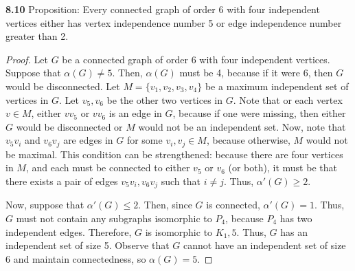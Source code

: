 \documentclass[12pt]{article}
\begin{document}
\newpage\noindent\textbf{8.10} Proposition: Every connected graph of order 6 with four independent vertices either has vertex independence number 5 or edge independence number greater than 2.
\begin{proof}
    Let $G$ be a connected graph of order 6 with four independent vertices.
    Suppose that $\alpha(G) \neq 5$.
    Then, $\alpha(G)$ must be 4, because if it were 6, then $G$ would be disconnected.
    Let $M = \{v_1, v_2, v_3, v_4\}$ be a maximum independent set of vertices in $G$.
    Let $v_5, v_6$ be the other two vertices in $G$.
    Note that or each vertex $v \in M$, either $vv_5$ or $vv_6$ is an edge in $G$, because if one were missing, then either $G$ would be disconnected or $M$ would not be an independent set.
    Now, note that $v_5v_i$ and $v_6v_j$ are edges in $G$ for some $v_i,v_j \in M$, because otherwise, $M$ would not be maximal.
    This condition can be strengthened: because there are four vertices in $M$, and each must be connected to either $v_5$ or $v_6$ (or both), it must be that there exists a pair of edges $v_5v_i, v_6v_j$ such that $i \neq j$.
    Thus, $\alpha'(G) \geq 2$.

    Now, suppose that $\alpha'(G) \leq 2$.
    Then, since $G$ is connected, $\alpha'(G) = 1$.
    Thus, $G$ must not contain any subgraphs isomorphic to $P_4$, because $P_4$ has two independent edges.
    Therefore, $G$ is isomorphic to $K_1,5$.
    Thus, $G$ has an independent set of size 5.
    Observe that $G$ cannot have an independent set of size 6 and maintain connectedness, so $\alpha(G) = 5$.
\end{proof}
\end{document}
